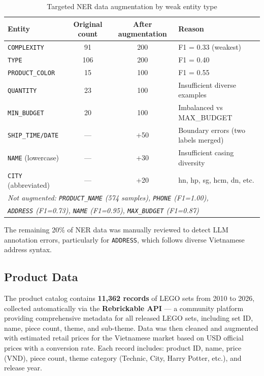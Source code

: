 \documentclass[12pt, a4paper]{report}
\begin{document}
\begin{table}[H]
\centering
\caption{Targeted NER data augmentation by weak entity type}
\label{tab:ner_augment}
\begin{tabular}{lccl}
\toprule
\textbf{Entity} & \textbf{Original count} & \textbf{After augmentation} & \textbf{Reason} \\
\midrule
\texttt{COMPLEXITY}      & 91  & 200 & F1 = 0.33 (weakest) \\
\texttt{TYPE}            & 106 & 200 & F1 = 0.40 \\
\texttt{PRODUCT\_COLOR}  & 15  & 100 & F1 = 0.55 \\
\texttt{QUANTITY}        & 23  & 100 & Insufficient diverse examples \\
\texttt{MIN\_BUDGET}     & 20  & 100 & Imbalanced vs MAX\_BUDGET \\
\texttt{SHIP\_TIME/DATE} & ---  & +50 & Boundary errors (two labels merged) \\
\texttt{NAME} (lowercase)& ---  & +30 & Insufficient casing diversity \\
\texttt{CITY} (abbreviated)& ---  & +20 & hn, hp, sg, hcm, dn, etc. \\
\midrule
\multicolumn{4}{l}{\textit{Not augmented: \texttt{PRODUCT\_NAME} (574 samples),
\texttt{PHONE} (F1=1.00),}} \\
\multicolumn{4}{l}{\textit{\texttt{ADDRESS} (F1=0.73), \texttt{NAME} (F1=0.95),
\texttt{MAX\_BUDGET} (F1=0.87)}} \\
\bottomrule
\end{tabular}
\end{table}

The remaining 20\% of NER data was manually reviewed to detect LLM annotation errors,
particularly for \texttt{ADDRESS}, which follows diverse Vietnamese address syntax.

\subsection{Product Data}

The product catalog contains \textbf{11,362 records} of LEGO sets from 2010 to 2026,
collected automatically via the \textbf{Rebrickable API} \cite{rebrickable} ---
a community platform providing comprehensive metadata for all released LEGO sets,
including set ID, name, piece count, theme, and sub-theme.
Data was then cleaned and augmented with estimated retail prices for the Vietnamese market
based on USD official prices with a conversion rate.
Each record includes: product ID, name, price (VND), piece count,
theme category (Technic, City, Harry Potter, etc.), and release year.
\end{document}
